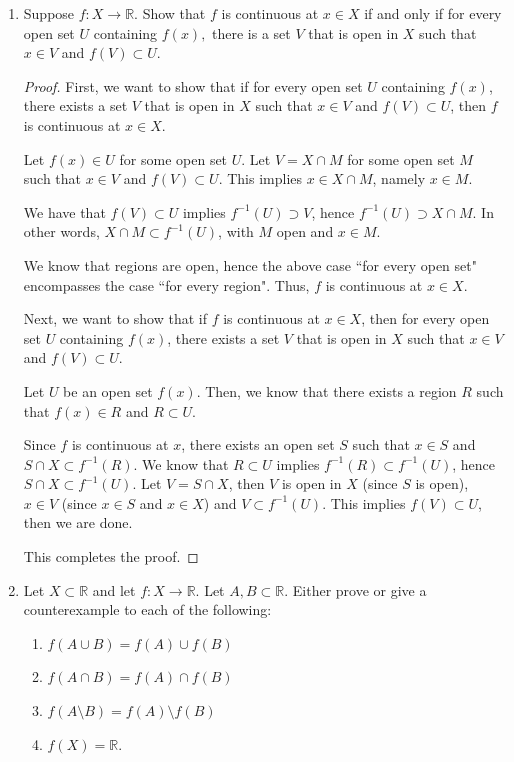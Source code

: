 \documentclass[11pt]{article}
\newcommand{\bbR}{\mathbb{R}}
\renewcommand{\_}[1]{\underline{ #1 }}
\theoremstyle{definition}
\numberwithin{equation}{subsection}
\begin{document}
\begin{enumerate}



\item Suppose $f:X\to \bbR$. Show that $f$ 
is continuous at  $x\in X$ if and only if for every open set $U$ containing $f(x),$ there is a set $V$ that is open in $X$ such that $x\in V$ and 
$f(V)\subset U.$ 


\begin{proof}
First, we want to show that if for every open set $U$ containing $f(x)$, there exists a set $V$ that is open in $X$ such that $x \in V$ and $f(V) \subset U$, then $f$ is continuous at $x \in X$.

Let $f(x) \in U$ for some open set $U$. Let $V = X \cap M$ for some open set $M$ such that $x \in V$ and $f(V) \subset U$. This implies $x \in X \cap M$, namely $x \in M$. 

We have that $f(V) \subset U$ implies $f^{-1}(U) \supset V$, hence $f^{-1}(U) \supset X \cap M$. In other words, $X \cap M \subset f^{-1}(U)$, with $M$ open and $x \in M$.  

We know that regions are open, hence the above case ``for every open set" encompasses the case ``for every region". Thus, $f$ is continuous at $x \in X$.

Next, we want to show that if $f$ is continuous at $x \in X$, then for every open set $U$ containing $f(x)$, there exists a set $V$ that is open in $X$ such that $x \in V$ and $f(V) \subset U$.

Let $U$ be an open set $f(x)$. Then, we know that there exists a region $R$ such that $f(x) \in R$ and $R \subset U$. 

Since $f$ is continuous at $x$, there exists an open set $S$ such that $x\in S$ and $S \cap X \subset f^{-1}(R)$. We know that $R \subset U$ implies $f^{-1}(R)\subset f^{-1}(U)$, hence $S \cap X \subset f^{-1}(U)$. Let $V = S \cap X$, then $V$ is open in $X$ (since $S$ is open), $x \in V$ (since $x \in S$ and $x\in X$) and $V \subset f^{-1}(U)$. This implies $f(V)\subset U$, then we are done.

This completes the proof.


\renewcommand\qedsymbol{QED}
\end{proof}




\item
Let $X\subset \bbR$ and let $f:X\longrightarrow \bbR. $ Let $A,B\subset \bbR.$ Either prove or give a counterexample to each of the following:
\begin{enumerate}
\item[a)] $f(A\cup B)=f(A)\cup f(B)$\\
\item[b)] $f(A\cap B)=f(A)\cap f(B)$\\
\item[c)] $f(A\setminus B)=f(A)\setminus f(B)$\\
\item[d)] $f(X)=\bbR.$
\end{enumerate}



\end{enumerate}
\end{document}
